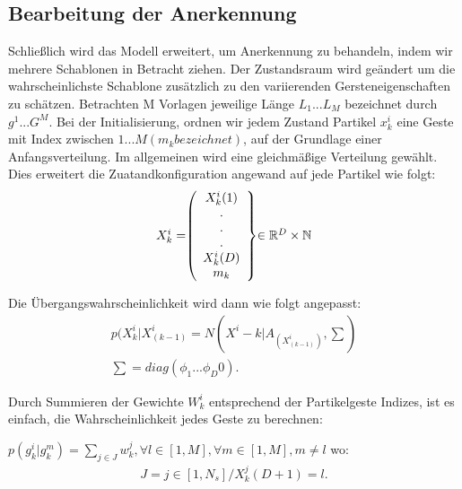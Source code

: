 \documentclass{llncs}
\begin{document}
\subsection{Bearbeitung der Anerkennung}
Schließlich wird das Modell erweitert, um Anerkennung zu behandeln, indem wir mehrere Schablonen in Betracht ziehen. Der Zustandsraum wird geändert um die wahrscheinlichste Schablone zusätzlich zu den variierenden Gersteneigenschaften zu schätzen.
 Betrachten M Vorlagen jeweilige Länge $L_1 ... L_M$ bezeichnet durch $g^1 ... G^M$. Bei der Initialisierung, ordnen wir jedem Zustand Partikel $x^i_k$ eine Geste mit Index zwischen $1 ... M (m_k bezeichnet)$, auf der Grundlage einer Anfangsverteilung. Im allgemeinen wird eine gleichmäßige Verteilung gewählt. Dies erweitert die Zuatandkonfiguration angewand auf jede Partikel wie folgt: 
\begin{equation}
\left.\begin{array}{l}
X^i_k =
 $$  \left(\begin{array}{crl}
 X^i_k (1)\\		
				.\\
				.\\
				.\\
			X^i_k (D)\\
				m_k\\ 
				
				\end{array}\right\}
		$$ \in \mathbb{R}^D \times \mathbb{N}						
\end{array}\right.		
\end{equation}	

Die Übergangswahrscheinlichkeit wird dann wie folgt angepasst:
\begin{equation}
\left.\begin{array}{l}				
p(X^i_k|X^i_(k-1) = N(X^i-k|A_(X^i_(k-1)), \sum)\\
			\sum =diag(\phi_1 ... \phi_D 0).								
\end{array}\right.		
\end{equation}				
			
Durch Summieren der Gewichte $W^i_k$  entsprechend der Partikelgeste Indizes, ist es einfach, die Wahrscheinlichkeit jedes Geste zu berechnen:

$p(g^i_k|g^m_k) =\sum_{j\in J}^{} w^j_k,  \forall l \in [1,M], \forall m \in [1,M], m \neq l
$
wo:
 \begin{equation}
 \left.\begin{array}{l}	
J = {j \in [1,N_s]/ X^j_k (D+1) = l}.									
\end{array}\right.		
\end{equation}	
\end{document}
